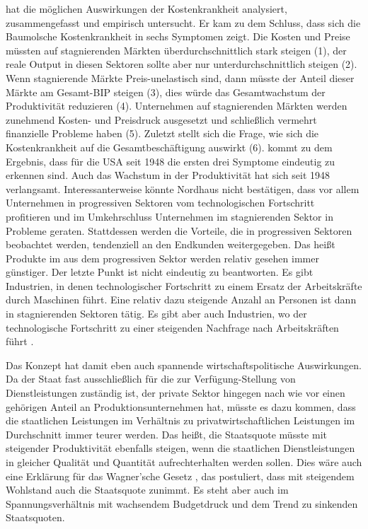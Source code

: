 \textcite{Nordhaus2008} hat die möglichen Auswirkungen der Kostenkrankheit analysiert, zusammengefasst und empirisch untersucht. Er kam zu dem Schluss, dass sich die Baumolsche Kostenkrankheit in sechs Symptomen zeigt. Die Kosten und Preise müssten auf stagnierenden Märkten überdurchschnittlich stark steigen (1), der reale Output in diesen Sektoren sollte aber nur unterdurchschnittlich steigen (2). Wenn stagnierende Märkte Preis-unelastisch sind, dann müsste der Anteil dieser Märkte am Gesamt-BIP steigen (3), dies würde das Gesamtwachstum der Produktivität reduzieren (4). Unternehmen auf stagnierenden Märkten werden zunehmend Kosten- und Preisdruck ausgesetzt und schließlich vermehrt finanzielle Probleme haben (5). Zuletzt stellt sich die Frage, wie sich die Kostenkrankheit auf die Gesamtbeschäftigung auswirkt (6). \textcite{Nordhaus2008} kommt zu dem Ergebnis, dass für die USA seit 1948 die ersten drei Symptome eindeutig zu erkennen sind. Auch das Wachstum in der Produktivität hat sich seit 1948 verlangsamt. Interessanterweise könnte Nordhaus nicht bestätigen, dass vor allem Unternehmen in progressiven Sektoren vom technologischen Fortschritt profitieren und im Umkehrschluss Unternehmen im stagnierenden Sektor in Probleme geraten. Stattdessen werden die Vorteile, die in progressiven Sektoren beobachtet werden, tendenziell an den Endkunden weitergegeben. Das heißt Produkte im aus dem progressiven Sektor werden relativ gesehen immer günstiger. Der letzte Punkt ist nicht eindeutig zu beantworten. Es gibt Industrien, in denen technologischer Fortschritt zu einem Ersatz der Arbeitskräfte durch Maschinen führt. Eine relativ dazu steigende Anzahl an Personen ist dann in stagnierenden Sektoren tätig. Es gibt aber auch Industrien, wo der technologische Fortschritt zu einer steigenden Nachfrage nach Arbeitskräften führt \parencite{Nordhaus2008}.

Das Konzept hat damit eben auch spannende wirtschaftspolitische Auswirkungen. Da der Staat fast ausschließlich für die zur Verfügung-Stellung von Dienstleistungen zuständig ist, der private Sektor hingegen nach wie vor einen gehörigen Anteil an Produktionsunternehmen hat, müsste es dazu kommen, dass die staatlichen Leistungen im Verhältnis zu privatwirtschaftlichen Leistungen im Durchschnitt immer teurer werden. Das heißt, die Staatsquote müsste mit steigender Produktivität ebenfalls steigen, wenn die staatlichen Dienstleistungen in gleicher Qualität und Quantität aufrechterhalten werden sollen. Dies wäre auch eine Erklärung für das Wagner'sche Gesetz \parencite{Wagner1892}, das postuliert, dass mit steigendem Wohlstand auch die Staatsquote zunimmt. Es steht aber auch im Spannungsverhältnis mit wachsendem Budgetdruck und dem Trend zu sinkenden Staatsquoten.